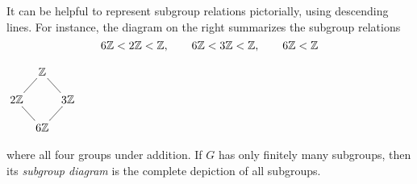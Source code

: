 \begin{minipage}[t]{0.83\linewidth}\vspace{0pt}
	
	It can be helpful to represent subgroup relations pictorially, using descending lines. For instance, the diagram on the right summarizes the subgroup relations
	\[
		6\mathbb{Z}<2\mathbb{Z}<\mathbb{Z},\qquad 6\mathbb{Z}<3\mathbb{Z}<\mathbb{Z},\qquad 6\mathbb{Z}<\mathbb{Z}
	\]
\end{minipage}
\hfill
\begin{minipage}[t]{0.15\linewidth}\vspace{0pt}
	\flushright$\xymatrix @C5pt @R12pt{%
		& \Z \ar@{-}[dl] \ar@{-}[dr] &\\
		2\Z \ar@{-}[dr] & & 3\Z \ar@{-}[dl]\\
		& 6\Z &\\
	}$
\end{minipage}
\medbreak
where all four groups under addition. If $G$ has only finitely many subgroups, then its \emph{subgroup diagram} is the complete depiction of all subgroups.



